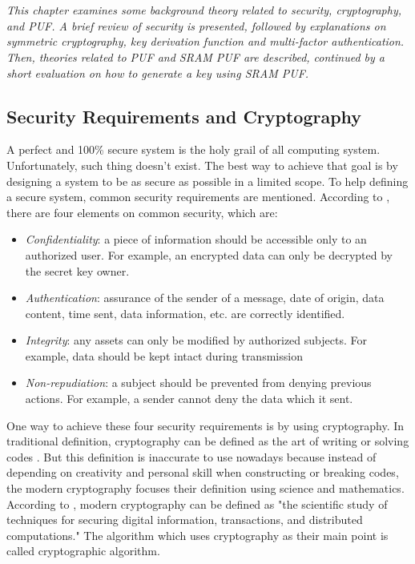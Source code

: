 \chapter{\chapterTwo}
\label{chp:2}

\textit{This chapter examines some background theory related to security, cryptography, and PUF. A brief review of security is presented, followed by explanations on symmetric cryptography, key derivation function and multi-factor authentication.
Then, theories related to PUF and SRAM PUF are described, continued by a short evaluation on how to generate a key using SRAM PUF.}

\section{Security Requirements and Cryptography}
\label{chapter2.1}

A perfect and 100\% secure system is the holy grail of all computing system. Unfortunately, such thing doesn't exist. The best way to achieve that goal is by designing a system to be as secure as possible in a limited scope.
To help defining a secure system, common security requirements are mentioned.
According to \cite{cryptography_decrypted}, there are four elements on common security, which are:
\begin{itemize}
  \item \textit{Confidentiality}: a piece of information should be accessible only to an authorized user. For example, an encrypted data can only be decrypted by the secret key owner.
  \item \textit{Authentication}: assurance of the sender of a message, date of origin, data content, time sent, data information, etc. are correctly identified.
  \item \textit{Integrity}: any assets can only be modified by authorized subjects. For example, data should be kept intact during transmission
  \item \textit{Non-repudiation}: a subject should be prevented from denying previous actions. For example, a sender cannot deny the data which it sent.
\end{itemize}

One way to achieve these four security requirements is by using cryptography. In traditional definition, cryptography can be defined as the art of writing or solving codes \cite{Oxford_dictionary}. But this definition is inaccurate to use nowadays because instead of depending on creativity and personal skill when constructing or breaking codes, the modern cryptography focuses their definition using science and mathematics. According to \cite{modern_cryptography}, modern cryptography can be defined as "the scientific study of techniques for securing digital information, transactions, and distributed computations." The algorithm which uses cryptography as their main point is called cryptographic algorithm.

